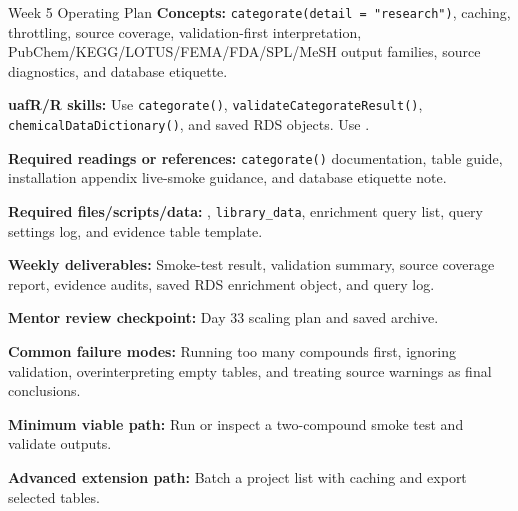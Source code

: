 \begin{checklistbox}{Week 5 Operating Plan}
\textbf{Concepts:} \texttt{categorate(detail = "research")}, caching, throttling, source coverage, validation-first interpretation, PubChem/KEGG/LOTUS/FEMA/FDA/SPL/MeSH output families, source diagnostics, and database etiquette.

\textbf{uafR/R skills:} Use \texttt{categorate()}, \texttt{validateCategorateResult()}, \texttt{chemicalDataDictionary()}, and saved RDS objects. Use .

\textbf{Required readings or references:} \texttt{categorate()} documentation, table guide, installation appendix live-smoke guidance, and database etiquette note.

\textbf{Required files/scripts/data:} , \texttt{library\_data}, enrichment query list, query settings log, and evidence table template.

\textbf{Weekly deliverables:} Smoke-test result, validation summary, source coverage report, evidence audits, saved RDS enrichment object, and query log.

\textbf{Mentor review checkpoint:} Day 33 scaling plan and saved archive.

\textbf{Common failure modes:} Running too many compounds first, ignoring validation, overinterpreting empty tables, and treating source warnings as final conclusions.

\textbf{Minimum viable path:} Run or inspect a two-compound smoke test and validate outputs.

\textbf{Advanced extension path:} Batch a project list with caching and export selected tables.
\end{checklistbox}

